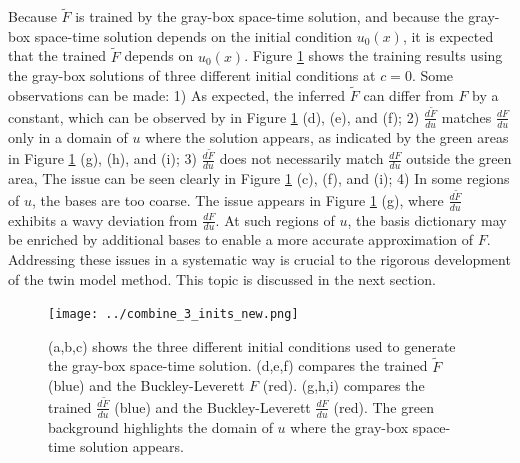 Because $\tilde{F}$ is trained by
the gray-box space-time solution, and because the gray-box space-time solution depends on
the initial condition $u_0(x)$, it is expected
that the trained $\tilde{F}$ depends on $u_0(x)$. 
Figure \ref{fig: combine 3} shows the training results using the gray-box solutions of
three different initial conditions at $c=0$.
Some observations can be made: 1) As expected, the inferred 
$\tilde{F}$ can differ from $F$ by a constant, which
can be observed by in Figure \ref{fig: combine 3} (d), (e), and (f); 
2) $\frac{d\tilde{F}}{du}$ matches $\frac{dF}{du}$ only in a
domain of $u$ where the solution appears, as indicated by the green areas in 
Figure \ref{fig: combine 3} (g), (h), and (i);
3) $\frac{d\tilde{F}}{du}$ does not necessarily match $\frac{dF}{du}$ outside the green area, 
The issue can be seen clearly in Figure \ref{fig: combine 3} (c), (f), and (i);
4) In some regions of $u$, the bases are too coarse. The issue appears
in Figure \ref{fig: combine 3} (g), where $\frac{d\tilde{F}}{du}$ exhibits
a wavy deviation from $\frac{dF}{du}$. At such regions of $u$, the basis dictionary may be enriched 
by additional bases to enable a more accurate approximation of $F$.
Addressing these issues in a systematic way is crucial to the rigorous development of
the twin model method. This topic is discussed in the next section.\\

\begin{figure}[htbp]
\begin{center}
    \texttt{[image: ../combine\_3\_inits\_new.png]}
    \caption{(a,b,c) shows the three different initial conditions used to generate
             the gray-box space-time solution. (d,e,f) compares the trained $\tilde{F}$ 
             (blue) and the Buckley-Leverett $F$ (red). (g,h,i) compares
             the trained $\frac{d\tilde{F}}{du}$ (blue) and the Buckley-Leverett 
             $\frac{dF}{du}$ (red). The green background highlights the domain of $u$ where
             the gray-box space-time solution appears.}
    \label{fig: combine 3}
\end{center}
\end{figure}


